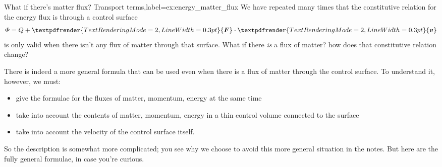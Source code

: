 \documentclass[a4paper,12pt,%
onecolumn,oneside,%
british%
]{memoir}
\renewcommand*{\bm}[1]{\textpdfrender{TextRenderingMode=2,LineWidth=0.3pt}{\boldsymbol{#1}}}
\renewcommand*{\|}[1][]{\nonscript\:#1\vert\nonscript\:\mathopen{}}
\newcommand*{\yv}{\bm{v}}
\newcommand*{\yH}{\varPhi}%
\newcommand*{\yQ}{Q}%
\newcommand*{\yF}{\bm{F}}
\begin{document}
\begin{extra}{What if there's matter flux? Transport terms,label={ex:energy_matter_flux}}
  We have repeated many times that the constitutive relation for the energy flux is through a control surface
  \begin{equation*}
    \yH = \yQ + \yF\cdot\yv
  \end{equation*}
  is only valid when there isn't any flux of matter through that surface. What if there \emph{is} a flux of matter? how does that constitutive relation change?

  There is indeed a more general formula that can be used even when there is a flux of matter through the control surface. To understand it, however, we must:
  \begin{itemize}[shift,nosep]
  \item give the formulae for the fluxes of matter, momentum, energy at the same time
  \item take into account the contents of matter, momentum, energy in a thin control volume connected to the surface
  \item take into account the velocity of the control surface itself.
  \end{itemize}
So the description is somewhat more complicated; you see why we choose to avoid this more general situation in the notes. But here are the fully general formulae, in case you're curious.


\end{extra}
\end{document}
